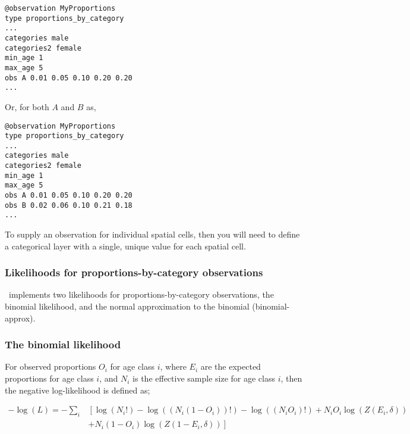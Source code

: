 {{{{{{{\small{\begin{verbatim}
@observation MyProportions
type proportions_by_category
...
categories male 
categories2 female
min_age 1
max_age 5
obs A 0.01 0.05 0.10 0.20 0.20
...
\end{verbatim}}}

Or, for both $A$ and $B$ as,

{\small{\begin{verbatim}
@observation MyProportions
type proportions_by_category
...
categories male
categories2 female
min_age 1
max_age 5
obs A 0.01 0.05 0.10 0.20 0.20
obs B 0.02 0.06 0.10 0.21 0.18
...
\end{verbatim}}}

To supply an observation for individual spatial cells, then you will need to define a categorical layer with a single, unique value for each spatial cell. 

\subsubsection{Likelihoods for proportions-by-category observations}

\SPM\ implements two likelihoods for proportions-by-category observations, the binomial likelihood, and the normal approximation to the binomial (binomial-approx). 

\subsubsection*{The binomial likelihood}

For observed proportions $O_i$ for age class $i$, where $E_i$ are the expected proportions for age class $i$, and $N_i$ is the effective sample size for age class $i$, then the negative log-likelihood is defined as;  

\begin{equation}
  \begin{split}
    -\log \left(L \right)= -\sum\limits_i & \left[ \right. \log \left(N_i! \right) - \log \left(\left(N_i \left(1 - O_i \right) \right)! \right) - \log \left(\left(N_i O_i \right)! \right) + N_i O_i \log \left(Z\left(E_i,\delta \right) \right) \\
    &+ N_i \left(1 - O_i \right)\log \left(Z\left(1 - E_i,\delta\right) \right) \left. \right]
  \end{split}
\end{equation}


}}}}}}
